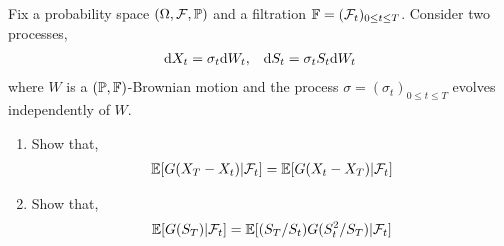 \begin{problem}
    Fix a probability space \( (\Omega,\mathcal{F},\mathbb{P}) \) and a filtration \( \mathbb{F} = (\mathcal{F}_t)_{0\leq t\leq T} \). Consider two processes,
    \begin{align*}
        \mathrm{d} X_t = \sigma_t \mathrm{d} W_t, && \mathrm{d} S_t = \sigma_t S_t \mathrm{d} W_t
    \end{align*}
    where \( W \) is a \( (\mathbb{P},\mathbb{F}) \)-Brownian motion and the process \( \sigma = (\sigma_t)_{0\leq t\leq T} \) evolves independently of \( W \).
\begin{enumerate}[nolistsep,label=(\alph*)]
    \item Show that,
        \begin{align*}
            \mathbb{E}[G(X_T-X_t)|\mathcal{F}_t] = \mathbb{E}[G(X_t-X_T)|\mathcal{F}_t]
        \end{align*}
    \item Show that,
        \begin{align*}
            \mathbb{E}[G(S_T)|\mathcal{F}_t] = \mathbb{E}[(S_T/S_t) G(S_t^2/S_T) | \mathcal{F}_t]
        \end{align*}
        
\end{enumerate}

\end{problem}

